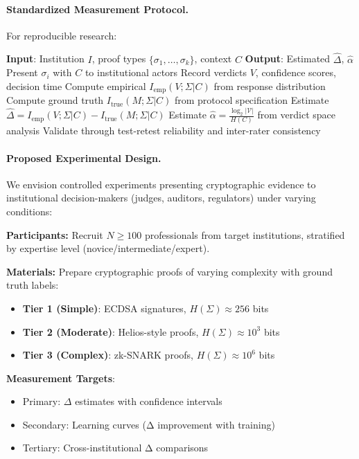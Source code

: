 \documentclass{ieeeaccess}
\begin{document}
\paragraph{Standardized Measurement Protocol.}
For reproducible research:

\begin{algorithmic}[1]
\STATE \textbf{Input}: Institution $I$, proof types $\{\sigma_1, \ldots, \sigma_k\}$, context $C$
\STATE \textbf{Output}: Estimated $\hat{\Delta}$, $\hat{\alpha}$
\STATE Present $\sigma_i$ with $C$ to institutional actors
\STATE Record verdicts $V$, confidence scores, decision time
\STATE Compute empirical $I_{\text{emp}}(V;\Sigma|C)$ from response distribution
\STATE Compute ground truth $I_{\text{true}}(M;\Sigma|C)$ from protocol specification
\STATE Estimate $\hat{\Delta} = I_{\text{emp}}(V;\Sigma|C) - I_{\text{true}}(M;\Sigma|C)$
\STATE Estimate $\hat{\alpha} = \frac{\log_2|\mathcal{V}|}{H(C)}$ from verdict space analysis
\STATE Validate through test-retest reliability and inter-rater consistency
\end{algorithmic}

\paragraph{Proposed Experimental Design.}
We envision controlled experiments presenting cryptographic evidence to institutional decision-makers (judges, auditors, regulators) under varying conditions:

\textbf{Participants:} Recruit $N \geq 100$ professionals from target institutions, stratified by expertise level (novice/intermediate/expert).

\textbf{Materials:} Prepare cryptographic proofs of varying complexity with ground truth labels:
\begin{itemize}
\item \textbf{Tier 1 (Simple)}: ECDSA signatures, $H(\Sigma) \approx 256$ bits
\item \textbf{Tier 2 (Moderate)}: Helios-style proofs, $H(\Sigma) \approx 10^3$ bits
\item \textbf{Tier 3 (Complex)}: zk-SNARK proofs, $H(\Sigma) \approx 10^6$ bits
\end{itemize}

\textbf{Measurement Targets}:
\begin{itemize}
\item Primary: $\Delta$ estimates with confidence intervals
\item Secondary: Learning curves (Δ improvement with training)
\item Tertiary: Cross-institutional Δ comparisons
\end{itemize}
\end{document}

